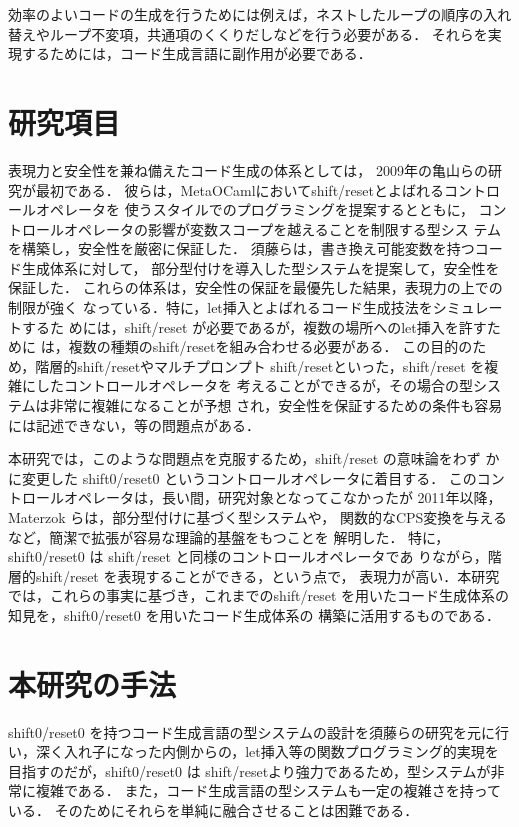 \documentclass[T]{compsoft}
\theoremstyle{break}
\begin{document}
効率のよいコードの生成を行うためには例えば，ネストしたループの順序の入れ替えやループ不変項，共通項のくくりだしなどを行う必要がある．
それらを実現するためには，コード生成言語に副作用が必要である．

\section{研究項目}
表現力と安全性を兼ね備えたコード生成の体系としては，
2009年の亀山らの研究\cite{Kameyama2009}が最初である．
彼らは，MetaOCamlにおいてshift/resetとよばれるコントロールオペレータを
使うスタイルでのプログラミングを提案するとともに，
コントロールオペレータの影響が変数スコープを越えることを制限する型シス
テムを構築し，安全性を厳密に保証した．
須藤ら\cite{Sudo2014}は，書き換え可能変数を持つコード生成体系に対して，
部分型付けを導入した型システムを提案して，安全性を保証した．
これらの体系は，安全性の保証を最優先した結果，表現力の上での制限が強く
なっている．特に，let挿入とよばれるコード生成技法をシミュレートするた
めには，shift/reset が必要であるが，複数の場所へのlet挿入を許すために
は，複数の種類のshift/resetを組み合わせる必要がある．
この目的のため，階層的shift/resetやマルチプロンプト
shift/resetといった，shift/reset を複雑にしたコントロールオペレータを
考えることができるが，その場合の型システムは非常に複雑になることが予想
され，安全性を保証するための条件も容易には記述できない，等の問題点がある．

本研究では，このような問題点を克服するため，shift/reset の意味論をわず
かに変更した shift0/reset0 というコントロールオペレータに着目する．
このコントロールオペレータは，長い間，研究対象となってこなかったが
2011年以降，Materzok らは，部分型付けに基づく型システムや，
関数的なCPS変換を与えるなど，簡潔で拡張が容易な理論的基盤をもつことを
解明した\cite{Materzok2011,materzok2012}．
特に，shift0/reset0 は shift/reset と同様のコントロールオペレータであ
りながら，階層的shift/reset を表現することができる，という点で，
表現力が高い．本研究では，これらの事実に基づき，これまでのshift/reset
を用いたコード生成体系の知見を，shift0/reset0 を用いたコード生成体系の
構築に活用するものである．

\section{本研究の手法}
shift0/reset0 を持つコード生成言語の型システムの設計を須藤らの研究\cite{Sudo2014}を元に行い，深く入れ子になった内側からの，let挿入等の関数プログラミング的実現を目指すのだが，shift0/reset0 は shift/resetより強力であるため，型システムが非常に複雑である．
また，コード生成言語の型システムも一定の複雑さを持っている．
そのためにそれらを単純に融合させることは困難である．
\end{document}
